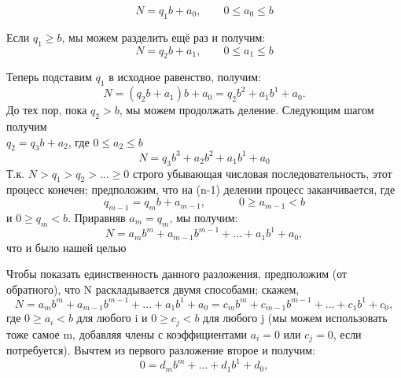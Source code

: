 \documentclass[11pt]{article}
\begin{document}
$$N = q_1b+a_0, \qquad 0 \leq a_{0}\leq b$$

Если $q_{1}\geq b $, мы можем разделить ещё раз и получим:
$$N = q_2b+a_1, \qquad 0 \leq a_{1}\leq b$$  

\thispagestyle{fancy}
\rhead{\thepage}
Теперь подставим $q_1$ в исходное равенство, получим: $$N = (q_{2}b+a_{1})b + a_{0} = q_{2}b^{2} + a_{1}b^{1} + a_{0} .$$
До тех пор, пока $q_{2}>b$, мы можем продолжать деление. Следующим шагом получим \\$q_{2}=q_{3}b+a_{2}$, где $0\leq a_{2} \leq b$   
$$N = q_{3}b^{3} + a_{2}b^{2} + a_{1}b^{1} + a_{0}$$
Т.к.  $N > q_{1} > q_{2} >...\geq 0$ строго убывающая числовая последовательность, этот процесс конечен; предположим, что на (n-1) делении процесс заканчивается, где $$q_{m-1} = q_{m}b + a_{m-1}, \qquad \quad  0\geq a_{m-1}<b $$
и $0 \geq q_{m} < b$. Приравняв $a_{m} = q_{m}$, мы получим: $$N = a_{m}b^{m} + a_{m-1}b^{m-1} + ... +a_{1}b^{1} + a_{0},$$ что и было нашей целью

Чтобы показать единственность данного разложения, предположим (от обратного), что N раскладывается двумя способами; скажем,$$N = a_{m}b^{m} + a_{m-1}b^{m-1} + ... +a_{1}b^{1} + a_{0} = c_{m}b^{m} + c_{m-1}b^{m-1} + ... +c_{1}b^{1} + c_{0},$$ где $ 0 \geq a_{i} < b$ для любого i и $0 \geq c_{j} < b$ для любого j (мы можем использовать тоже самое m, добавляя члены с коэффициентами $a_{i} = 0$ или $c_{j} = 0$, если потребуется). Вычтем из первого разложение второе и получим: $$0 = d_{m}b^{m} + ... + d_{1}b^{1} + d_0,$$
 


	
	
	

	
	
\end{document}
